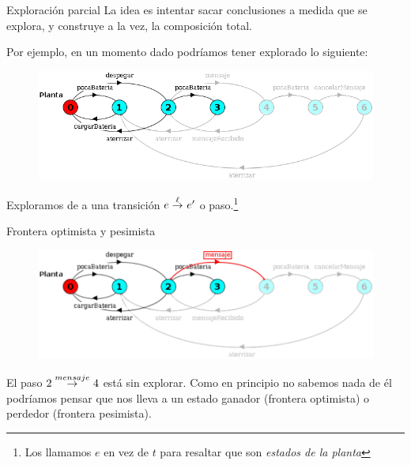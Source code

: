 

\begin{frame}{Exploración parcial}
    La idea es intentar sacar conclusiones a medida que se explora, y construye a la vez, la composición total.
    
    Por ejemplo, en un momento dado podríamos tener explorado lo siguiente:
    \begin{figure}
     \includegraphics[width=\textwidth]{figures/partial.png}
    \end{figure}
    
    Exploramos de a una transición $e \overset{\ell}{\rightarrow}_{} e'$ o paso.\vspace{10pt}\footnote{Los llamamos $e$ en vez de $t$ para resaltar que son \textit{estados de la planta}}
\end{frame}
\begin{frame}{Frontera optimista y pesimista}
    \begin{figure}
     \includegraphics[width=\textwidth]{figures/frontera.png}
    \end{figure}
    El paso $2 \overset{mensaje}{\rightarrow}_{} 4$ está sin explorar. Como en principio no sabemos nada de él podríamos pensar que nos lleva a un estado ganador (frontera optimista) o perdedor (frontera pesimista).
\end{frame}
